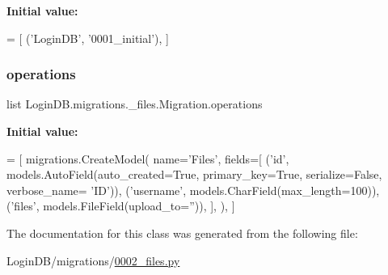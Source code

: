{\bfseries Initial value\+:}
\begin{DoxyCode}
=  [
        (\textcolor{stringliteral}{'LoginDB'}, \textcolor{stringliteral}{'0001\_initial'}),
    ]
\end{DoxyCode}
\mbox{\label{class_login_d_b_1_1migrations_1_10002__files_1_1_migration_a09dc692658989e90ef82e3aafab0c427}} 
\subsubsection{\texorpdfstring{operations}{operations}}
{\footnotesize\ttfamily list Login\+D\+B.\+migrations.\+\_\+files.\+Migration.\+operations\hspace{0.3cm}{\ttfamily [static]}}

{\bfseries Initial value\+:}
\begin{DoxyCode}
=  [
        migrations.CreateModel(
            name=\textcolor{stringliteral}{'Files'},
            fields=[
                (\textcolor{stringliteral}{'id'}, models.AutoField(auto\_created=\textcolor{keyword}{True}, primary\_key=\textcolor{keyword}{True}, serialize=\textcolor{keyword}{False}, verbose\_name=\textcolor{stringliteral}{
      'ID'})),
                (\textcolor{stringliteral}{'username'}, models.CharField(max\_length=100)),
                (\textcolor{stringliteral}{'files'}, models.FileField(upload\_to=\textcolor{stringliteral}{''})),
            ],
        ),
    ]
\end{DoxyCode}


The documentation for this class was generated from the following file\+:\begin{DoxyCompactItemize}
\item 
Login\+D\+B/migrations/\hyperlink{0002__files_8py}{0002\+\_\+files.\+py}\end{DoxyCompactItemize}
